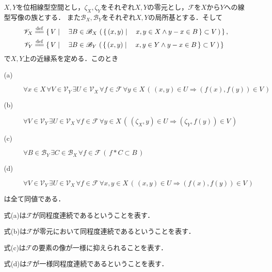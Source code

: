 	\begin{screen}
		\begin{thm}[位相線型空間上の同程度連続性]
		\label{thm:equicontinuity_on_topological_vector_spaces}
			$X,Y$を位相線型空間とし，$\zeta_X,\zeta_Y$をそれぞれ$X,Y$の零元とし，$\mathscr{F}$を$X$から$Y$への線型写像の族とする．
			また$\mathscr{B}_X,\mathscr{B}_Y$をそれぞれ$X,Y$の局所基とする．そして
			\begin{align}
				\mathscr{V}_X &\defeq \Set{V}{\exists B \in \mathscr{B}_X\, \left(\, 
					\Set{(x,y)}{x,y \in X \wedge y-x \in B} \subset V\, \right)}, \\
				\mathscr{V}_Y &\defeq \Set{V}{\exists B \in \mathscr{B}_Y\, \left(\, 
					\Set{(x,y)}{x,y \in Y \wedge y-x \in B} \subset V\, \right)}
			\end{align}
			で$X,Y$上の近縁系を定める．このとき
			\begin{description}
				\item[(a)] $\forall x \in X\, \forall V \in \mathscr{V}_Y\, \exists U \in \mathscr{V}_X\, \forall f \in \mathscr{F}\,
					\forall y \in X\, \left(\, (x,y) \in U \Longrightarrow (f(x),f(y)) \in V\, \right)$
					
				\item[(b)] $\forall V \in \mathscr{V}_Y\, \exists U \in \mathscr{V}_X\, \forall f \in \mathscr{F}\,
					\forall y \in X\, \left(\, (\zeta_X,y) \in U \Longrightarrow (\zeta_Y,f(y)) \in V\, \right)$
					
				\item[(c)] $\forall B \in \mathscr{B}_Y\, \exists C \in \mathscr{B}_X\, \forall f \in \mathscr{F}\, 
					\left(\, f \ast C \subset B\, \right)$
				
				\item[(d)] $\forall V \in \mathscr{V}_Y\, \exists U \in \mathscr{V}_X\, \forall f \in \mathscr{F}\,
					\forall x,y \in X\, \left(\, (x,y) \in U \Longrightarrow (f(x),f(y)) \in V\, \right)$
			\end{description}
			は全て同値である．
		\end{thm}
	\end{screen}
	
	式(a)は$\mathscr{F}$が同程度連続であるということを表す．
	
	式(b)は$\mathscr{F}$が零元において同程度連続であるということを表す．
	
	式(c)は$\mathscr{F}$の要素の像が一様に抑えられることを表す．
	
	式(d)は$\mathscr{F}$が一様同程度連続であるということを表す．
	
